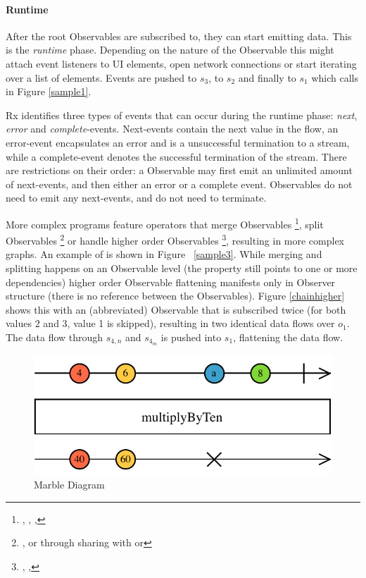 \paragraph{Runtime} After the root Observables are subscribed to, they
can start emitting data.  This is the \emph{runtime} phase.  Depending
on the nature of the Observable this might attach event listeners to UI
elements, open network connections or start iterating over a list of
elements.  Events are pushed to $ s_3 $, to $ s_2 $ and finally to $ s_1
$ which calls  in Figure%
\ref{sample1}.

Rx identifies three types of events that can occur during the runtime
phase:  \emph{next}, \emph{error} and \emph{complete}-events.
Next-events contain the next value in the flow, an error-event
encapsulates an error and is a unsuccessful termination to a stream,
while a complete-event denotes the successful termination of the stream.
There are restrictions on their order:  a Observable may first emit an
unlimited amount of next-events, and then either an error or a complete
event.  Observables do not need to emit any next-events, and do not need
to terminate.

More complex programs feature operators that merge Observables%
\footnote{ , , , 
}, split Observables%
\footnote{ , or through sharing with  or
 } or handle higher order Observables%
\footnote{ , ,  },
resulting in more complex graphs.  An example of  is shown
in Figure~%
\ref{sample3}.  While merging and splitting happens on an Observable
level (the  property still points to one or more
dependencies) higher order Observable flattening manifests only in
Observer structure (there is no reference between the Observables).
Figure%
\ref{chainhigher} shows this with an (abbreviated) 
Observable that is subscribed twice (for both values $ 2 $ and $ 3 $,
value 1 is skipped), resulting in two identical data flows over $ o_1 $.
The data flow through $ s_{4,n} $ and $ s_{4_m} $ is pushed into $ s_1 $,
flattening the data flow.

\begin{figure}[t]
    \centering
    \includegraphics[width=\columnwidth]{images/marble-diagram.pdf}
    \caption{Marble Diagram}%
    \label{marblediagram-image}
\end{figure}

